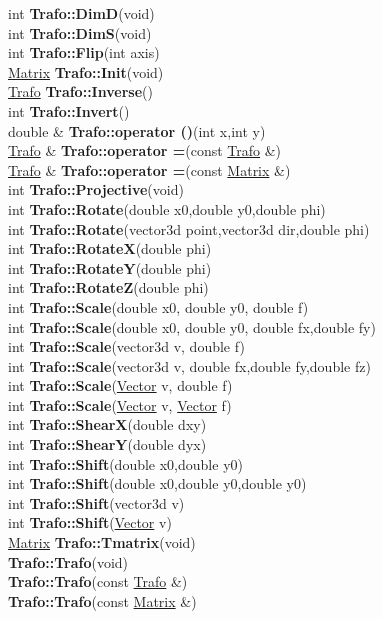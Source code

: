 \documentclass[10pt,titlepage]{article}
\def\functionlistentry#1#2#3#4#5#6{\noindent #1 {\bf #2}(#3) \dotfill #6\\}
\def\letterref#1{}
\def\letterlabelend#1{}
\begin{document}
{{\letterref{Ta}
\letterref{Te}
\letterref{Ti}
\letterref{Tr}
\letterlabelend{Tr}
\functionlistentry{int}{Trafo::DimD}{void}{690}{geoTrafo}{}
\functionlistentry{int}{Trafo::DimS}{void}{689}{geoTrafo}{}
\functionlistentry{int}{Trafo::Flip}{int axis}{704}{geoTrafo}{}
\functionlistentry{\hyperlink{Matrix}{Matrix}}{Trafo::Init}{void}{692}{geoTrafo}{}
\functionlistentry{\hyperlink{Trafo}{Trafo}}{Trafo::Inverse}{}{694}{geoTrafo}{}
\functionlistentry{int}{Trafo::Invert}{}{693}{geoTrafo}{}
\functionlistentry{double \&}{Trafo::operator ()}{int x,int y}{686}{geoTrafo}{}
\functionlistentry{\hyperlink{Trafo}{Trafo} \&}{Trafo::operator =}{const \hyperlink{Trafo}{Trafo} \&}{684}{geoTrafo}{}
\functionlistentry{\hyperlink{Trafo}{Trafo} \&}{Trafo::operator =}{const \hyperlink{Matrix}{Matrix} \&}{685}{geoTrafo}{}
\functionlistentry{int}{Trafo::Projective}{void}{713}{geoTrafo}{}
\functionlistentry{int}{Trafo::Rotate}{double x0,double y0,double phi}{699}{geoTrafo}{}
\functionlistentry{int}{Trafo::Rotate}{vector3d point,vector3d dir,double phi}{700}{geoTrafo}{}
\functionlistentry{int}{Trafo::RotateX}{double phi}{701}{geoTrafo}{}
\functionlistentry{int}{Trafo::RotateY}{double phi}{702}{geoTrafo}{}
\functionlistentry{int}{Trafo::RotateZ}{double phi}{703}{geoTrafo}{}
\functionlistentry{int}{Trafo::Scale}{double x0, double y0, double f}{707}{geoTrafo}{}
\functionlistentry{int}{Trafo::Scale}{double x0, double y0, double fx,double fy}{708}{geoTrafo}{}
\functionlistentry{int}{Trafo::Scale}{vector3d v, double f}{709}{geoTrafo}{}
\functionlistentry{int}{Trafo::Scale}{vector3d v, double fx,double fy,double fz}{710}{geoTrafo}{}
\functionlistentry{int}{Trafo::Scale}{\hyperlink{Vector}{Vector} v, double f}{711}{geoTrafo}{}
\functionlistentry{int}{Trafo::Scale}{\hyperlink{Vector}{Vector} v, \hyperlink{Vector}{Vector} f}{712}{geoTrafo}{}
\functionlistentry{int}{Trafo::ShearX}{double dxy}{705}{geoTrafo}{}
\functionlistentry{int}{Trafo::ShearY}{double dyx}{706}{geoTrafo}{}
\functionlistentry{int}{Trafo::Shift}{double x0,double y0}{695}{geoTrafo}{}
\functionlistentry{int}{Trafo::Shift}{double x0,double y0,double y0}{696}{geoTrafo}{}
\functionlistentry{int}{Trafo::Shift}{vector3d v}{697}{geoTrafo}{}
\functionlistentry{int}{Trafo::Shift}{\hyperlink{Vector}{Vector} v}{698}{geoTrafo}{}
\functionlistentry{\hyperlink{Matrix}{Matrix}}{Trafo::Tmatrix}{void}{691}{geoTrafo}{}
\functionlistentry{}{Trafo::Trafo}{void}{680}{geoTrafo}{}
\functionlistentry{}{Trafo::Trafo}{const \hyperlink{Trafo}{Trafo} \&}{681}{geoTrafo}{}
\functionlistentry{}{Trafo::Trafo}{const \hyperlink{Matrix}{Matrix} \&}{682}{geoTrafo}{}
}}
\end{document}

